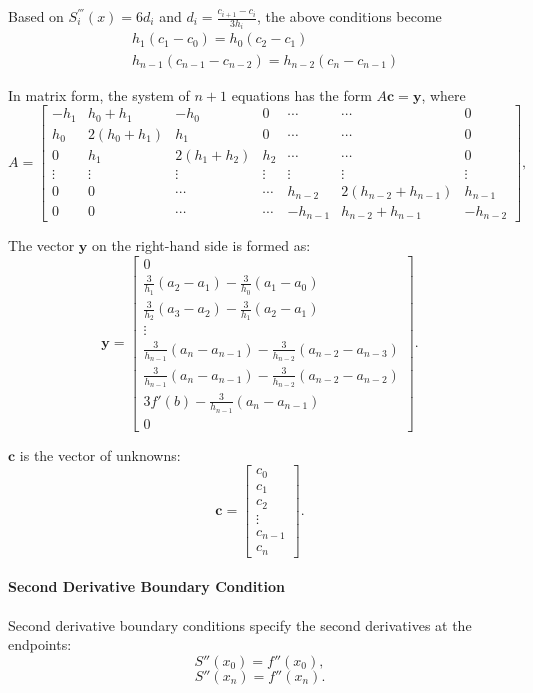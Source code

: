 \documentclass[a4paper]{article}
\begin{document}
\begin{sloppypar}
Based on $S_i^{'''}(x)=6d_i$ and $d_i=\frac{c_{i+1}-c_i}{3h_i}$, the above conditions become
$$
\begin{aligned}
  &h_1(c_1-c_0)=h_0(c_2-c_1)\\
  &h_{n-1}(c_{n-1}-c_{n-2})=h_{n-2}(c_n-c_{n-1})
\end{aligned}
$$

In matrix form, the system of $n+1$ equations has the form $A\mathbf{c} = \mathbf{y}$, where
\[ A = \begin{bmatrix}
  -h_1 & h_0+h_1 & -h_0 & 0 & \cdots & \cdots& 0 \\
  h_0 & 2(h_0 + h_1) & h_1 & 0 & \cdots & \cdots& 0 \\
  0 & h_1 & 2(h_1 + h_2) & h_2 & \cdots & \cdots& 0 \\
  \vdots & \vdots & \vdots & \vdots &\vdots &\vdots & \vdots \\
  0 & 0 & \cdots & \cdots& h_{n-2} & 2(h_{n-2} + h_{n-1}) & h_{n-1} \\
  0 & 0 &  \cdots & \cdots& -h_{n-1}  & h_{n-2} + h_{n-1} & -h_{n-2}
  \end{bmatrix}, \]
  
  
  The vector \(\mathbf{y}\) on the right-hand side is formed as:
  \[
  \mathbf{y} = \begin{bmatrix}
    0 \\
    \frac{3}{h_1}(a_2 - a_1) - \frac{3}{h_0}(a_1 - a_0) \\
    \frac{3}{h_2}(a_3 - a_2) - \frac{3}{h_1}(a_2 - a_1) \\
    \vdots \\
    \frac{3}{h_{n-1}}(a_n - a_{n-1}) - \frac{3}{h_{n-2}}(a_{n-2} - a_{n-3}) \\
    \frac{3}{h_{n-1}}(a_n - a_{n-1}) - \frac{3}{h_{n-2}}(a_{n-2} - a_{n-2}) \\
    3f'(b) - \frac{3}{h_{n-1}}(a_n - a_{n-1}) \\
    0
  \end{bmatrix}.
  \]
  
  \(\mathbf{c}\) is the vector of unknowns:
  \[
  \mathbf{c} = \begin{bmatrix}
  c_0 \\
  c_1 \\
  c_2 \\
  \vdots \\
  c_{n-1} \\
  c_n
  \end{bmatrix}.
\]

\paragraph*{Second Derivative Boundary Condition}
Second derivative boundary conditions specify the second derivatives at the endpoints:
\[ S''(x_0) = f''(x_0), \]
\[ S''(x_n) = f''(x_n). \]


\end{sloppypar}
\end{document}
